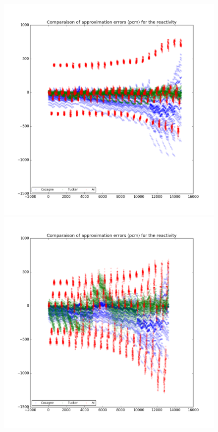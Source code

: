 \begin{center}
\begin{figure}[h]
\begin{minipage}[b]{0.32\linewidth}
      \centering \includegraphics[scale=0.2]{images/UOX/ReactivityError.png}
   \end{minipage}
   \begin{minipage}[b]{0.32\linewidth}
      \centering \includegraphics[scale=0.2]{images/UOX-Gd/ReactivityError.png}
   \end{minipage}
\end{figure}
\end{center}


